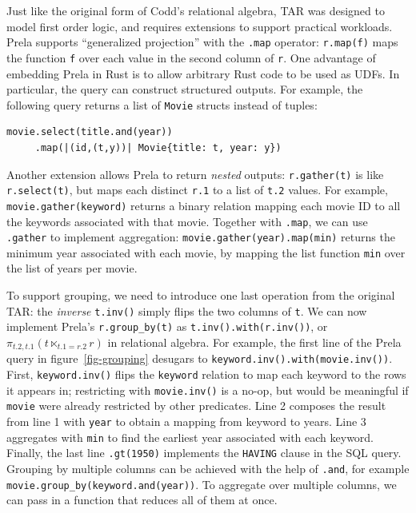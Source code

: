 \documentclass[sigconf,screen,pbalance]{cidr-2027}
\newcommand{\noun}[1]{\textsf{#1}}
\newcommand{\code}{\lstinline[style=prela]}
\newcommand{\sql}{\lstinline[style=sql]}
\begin{document}
Just like the original form of Codd's relational algebra, \noun{TAR} was designed to model first order logic, and requires extensions to support practical workloads.
Prela supports ``generalized projection'' with the \code|.map| operator: \code|r.map(f)| maps the function \code|f| over each value in the second column of \code|r|.
One advantage of embedding Prela in Rust is to allow arbitrary Rust code to be used as UDFs.
In particular, the query can construct structured outputs.
For example, the following query returns a list of \code|Movie| structs instead of tuples:

\begin{lstlisting}
movie.select(title.and(year))
     .map(|(id,(t,y))| Movie{title: t, year: y})
\end{lstlisting}

Another extension allows Prela to return \emph{nested} outputs: \code|r.gather(t)| is like \code|r.select(t)|, but maps each distinct \code|r.1| to a list of \code|t.2| values.
For example, \code|movie.gather(keyword)| returns a binary relation mapping each movie ID to all the keywords associated with that movie.
Together with \code|.map|, we can use \code|.gather| to implement aggregation: \code|movie.gather(year).map(min)| returns the minimum year associated with each movie, by mapping the list function \code|min| over the list of years per movie.

To support grouping, we need to introduce one last operation from the original \noun{TAR}: the \emph{inverse} \code|t.inv()| simply flips the two columns of \code|t|.
We can now implement Prela's \code|r.group_by(t)| as \code|t.inv().with(r.inv())|, or $\pi_{t.2, t.1}(t \ltimes_{t.1 = r.2} r)$ in relational algebra.
For example, the first line of the Prela query in figure~\ref{fig-grouping} desugars to \code|keyword.inv().with(movie.inv())|.
First, \code|keyword.inv()| flips the \code|keyword| relation to map each keyword to the rows it appears in; restricting with \code|movie.inv()| is a no-op, but would be meaningful if \code|movie| were already restricted by other predicates.
Line 2 composes the result from line 1 with \code|year| to obtain a mapping from keyword to years.
Line 3 aggregates with \code|min| to find the earliest year associated with each keyword.
Finally, the last line \code|.gt(1950)| implements the \sql|HAVING| clause in the SQL query.
Grouping by multiple columns can be achieved with the help of \code|.and|, for example \code|movie.group_by(keyword.and(year))|.
To aggregate over multiple columns, we can pass in a function that reduces all of them at once.
\end{document}
